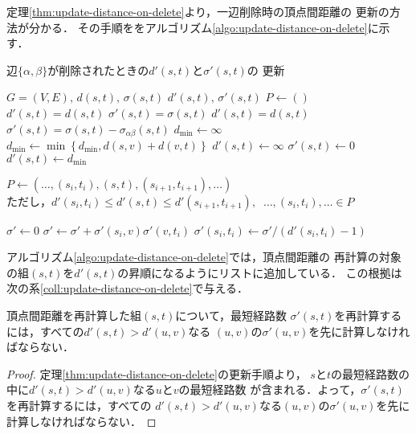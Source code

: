 定理\ref{thm:update-distance-on-delete}より，一辺削除時の頂点間距離の
更新の方法が分かる．
その手順ををアルゴリズム\ref{algo:update-distance-on-delete}に示す．
\begin{algorithm}[H]
  \caption{辺$\{\alpha,\beta\}$が削除されたときの$d'(s,t)$と$\sigma'(s,t)$の
    更新}\label{algo:update-distance-on-delete}
  \begin{algorithmic}[1]
    \Require $G=(V,E),\,d(s,t),\,\sigma(s,t)$
    \Ensure $d'(s,t),\,\sigma'(s,t)$
    \State $P\gets()$
    \State $d'(s,t)=d(s,t)$
    \State $\sigma'(s,t)=\sigma(s,t)$
    \State $d'(s,t)=d(s,t)$
    \State $\sigma'(s,t)=\sigma(s,t)-\sigma_{\alpha\beta}(s,t)$
    \State $d_{\min}\gets \infty$
    \State $d_{\min}\gets\min\left\{d_{\min},d(s,v)+d(v,t)\right\}$
    \EndFor
    \State $d'(s,t)\gets\infty$
    \State $\sigma'(s,t)\gets0$
    \Else
    \State $d'(s,t)\gets d_{\min}$
    \State \parbox[t]{\linewidth}{
      $P\gets(\ldots,(s_i,t_i),(s,t),(s_{i+1},t_{i+1}),\ldots)$ \\
      ただし，$d'(s_i,t_i)\leq d'(s,t)\leq d'(s_{i+1},t_{i+1}),\:$
      $\ldots,(s_i,t_i),\ldots\in P$
    }
    \EndIf
    \EndIf
    \EndFor
    \State $\sigma'\gets0$
    \State $\sigma'\gets\sigma'+\sigma'(s_i,v)\sigma'(v,t_i)$
    \EndFor
    \State $\sigma'(s_i,t_i)\gets\sigma'/(d'(s_i,t_i)-1)$
    \EndFor
  \end{algorithmic}
\end{algorithm}

アルゴリズム\ref{algo:update-distance-on-delete}では，頂点間距離の
再計算の対象の組$(s,t)$を$d'(s,t)$の昇順になるようにリストに追加している．
この根拠は次の系\ref{coll:update-distance-on-delete}で与える．
\begin{collary}
  \label{coll:update-distance-on-delete}
  頂点間距離を再計算した組$(s,t)$について，最短経路数
  $\sigma'(s,t)$を再計算するには，すべての$d'(s,t)>d'(u,v)$なる
  $(u,v)$の$\sigma'(u,v)$を先に計算しなければならない．
\end{collary}
\begin{proof}
  定理\ref{thm:update-distance-on-delete}の更新手順より，
  $s$と$t$の最短経路数の中に$d'(s,t)>d'(u,v)$なる$u$と$v$の最短経路数
  が含まれる．よって，$\sigma'(s,t)$を再計算するには，すべての
  $d'(s,t)>d'(u,v)$なる$(u,v)$の$\sigma'(u,v)$を先に計算しなければならない．
\end{proof}

